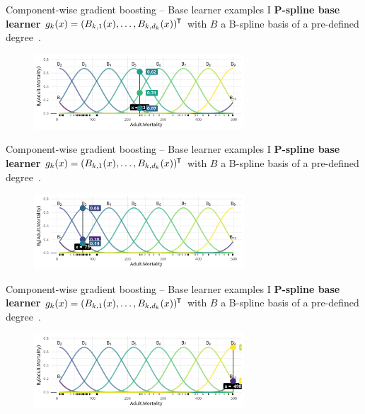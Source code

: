 
\begin{frame}{Component-wise gradient boosting -- Base learner examples I}
  \textbf{P-spline base learner} $g_k(x) = (B_{k,1}(x), \dots, B_{k,d_k}(x))^{\mkern-1.5mu\mathsf{T}}$ with $B$ a B-spline basis of a pre-defined degree~\citep{eilers1996flexible}.
  \begin{center}
    \begin{figure}
      \includegraphics[width=0.7\textwidth]{figures/bs-base/fig-bs1.png}
    \end{figure}
  \end{center}
  
  
\end{frame}


\begin{frame}{Component-wise gradient boosting -- Base learner examples I}
  \textbf{P-spline base learner} $g_k(x) = (B_{k,1}(x), \dots, B_{k,d_k}(x))^{\mkern-1.5mu\mathsf{T}}$ with $B$ a B-spline basis of a pre-defined degree~\citep{eilers1996flexible}.
  \begin{center}
    \begin{figure}
      \includegraphics[width=0.7\textwidth]{figures/bs-base/fig-bs59.png}
    \end{figure}
  \end{center}
  
  \addtocounter{framenumber}{-1}
\end{frame}


\begin{frame}{Component-wise gradient boosting -- Base learner examples I}
  \textbf{P-spline base learner} $g_k(x) = (B_{k,1}(x), \dots, B_{k,d_k}(x))^{\mkern-1.5mu\mathsf{T}}$ with $B$ a B-spline basis of a pre-defined degree~\citep{eilers1996flexible}.
  \begin{center}
    \begin{figure}
      \includegraphics[width=0.7\textwidth]{figures/bs-base/fig-bs40.png}
    \end{figure}
  \end{center}
  
  \addtocounter{framenumber}{-1}
\end{frame}


